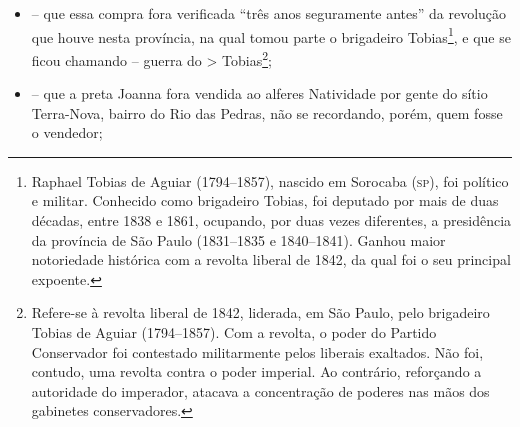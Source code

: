 \begin{itemize}
\item
  -- que essa compra fora verificada ``três anos seguramente antes'' da
  revolução que houve nesta província, na qual tomou parte o brigadeiro
  Tobias\footnote{ Raphael Tobias de Aguiar (1794--1857), nascido em
    Sorocaba (\textsc{sp}), foi político e militar. Conhecido como brigadeiro
    Tobias, foi deputado por mais de duas décadas, entre 1838 e 1861,
    ocupando, por duas vezes diferentes, a presidência da província de
    São Paulo (1831--1835 e 1840--1841). Ganhou maior notoriedade
    histórica com a revolta liberal de 1842, da qual foi o seu principal
    expoente.}, e que se ficou chamando -- guerra do \textgreater{}
  Tobias\footnote{ Refere-se à revolta liberal de 1842, liderada, em
    São Paulo, pelo brigadeiro Tobias de Aguiar (1794--1857). Com a
    revolta, o poder do Partido Conservador foi contestado militarmente
    pelos liberais exaltados. Não foi, contudo, uma revolta contra o
    poder imperial. Ao contrário, reforçando a autoridade do imperador,
    atacava a concentração de poderes nas mãos dos gabinetes
    conservadores.};
\item
  -- que a preta Joanna fora vendida ao alferes Natividade por gente do
  sítio Terra-Nova, bairro do Rio das Pedras, não se recordando, porém,
  quem fosse o vendedor;
\end{itemize}

